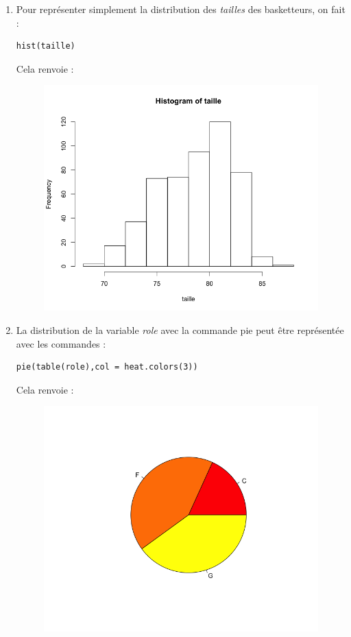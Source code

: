 \begin{enumerate}
\begin{itemize}
\end{itemize}
\item Pour représenter simplement la distribution des \textit{tailles} des basketteurs, on fait :
\begin{lstlisting}[language=html]
hist(taille)
\end{lstlisting}
Cela renvoie :
\begin{figure}[H]\begin{center}\includegraphics[scale=0.4]{ilu/gra83.png}\end{center}\end{figure}

\item La distribution de la variable \textit{role} avec la commande pie peut être représentée avec les commandes :
\begin{lstlisting}[language=html]
pie(table(role),col = heat.colors(3))
\end{lstlisting}
Cela renvoie :
\begin{figure}[H]\begin{center}\includegraphics[scale=0.4]{ilu/gra84.png}\end{center}\end{figure}


\end{enumerate}
